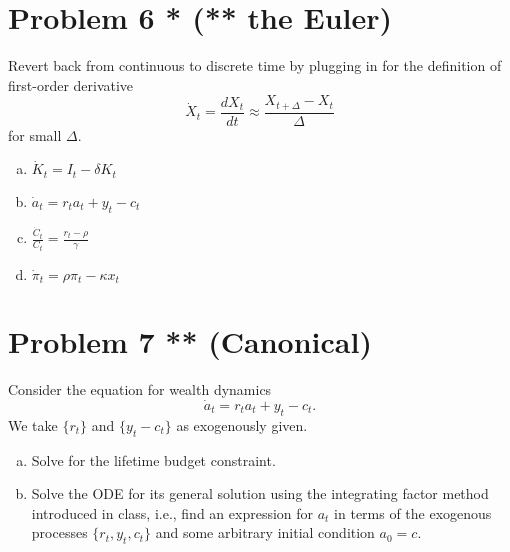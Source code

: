 \documentclass[11pt]{extarticle}
\theoremstyle{plain}
\theoremstyle{definition}
\begin{document}
\vspace{10mm}
\section*{Problem 6 * (** the Euler)}

Revert back from continuous to discrete time by plugging in for the definition of first-order derivative
\begin{equation*}
	\dot X_t = \frac{dX_t}{dt} \approx \frac{X_{t+\Delta} - X_t}{\Delta}
\end{equation*}
for small $\Delta$. 

\begin{enumerate}[(a)]
\item $\dot K_t = I_t - \delta K_t$

\item $\dot a_t = r_t a_t + y_t - c_t$

\item $\frac{\dot C_t}{C_t} = \frac{r_t - \rho}{\gamma}$

\item $\dot \pi_t = \rho \pi_t - \kappa x_t$
\end{enumerate}



\vspace{10mm}
\section*{Problem 7  ** (Canonical)}

Consider the equation for wealth dynamics
\begin{equation*}
	\dot a_t = r_t a_t + y_t - c_t.
\end{equation*}
We take $\{r_t\}$ and $\{y_t - c_t\}$ as exogenously given.

\begin{enumerate}[(a)]
\item Solve for the lifetime budget constraint.

\item Solve the ODE for its general solution using the integrating factor method introduced in class, i.e., find an expression for $a_t$ in terms of the exogenous processes $\{r_t, y_t, c_t\}$ and some arbitrary initial condition $a_0 = c$. 

\end{enumerate}
\end{document}
